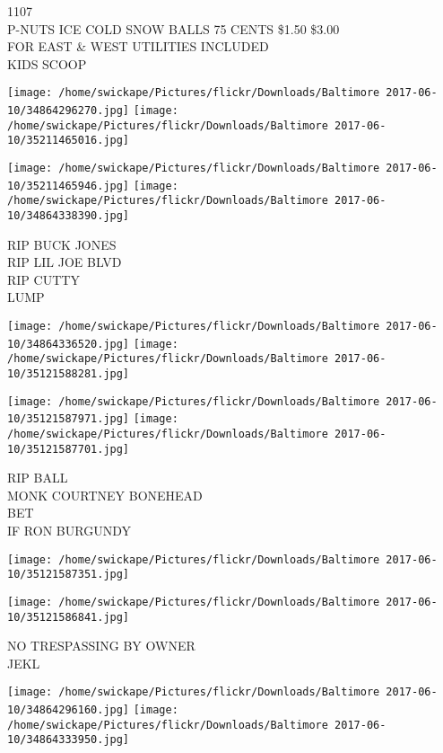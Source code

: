 \documentclass[10pt,letterpaper]{article}
\begin{document}
1107\\
P{-}NUTS ICE COLD SNOW BALLS 75 CENTS \$1.50 \$3.00\\
FOR EAST \& WEST UTILITIES INCLUDED\\
KIDS SCOOP\\
\pagebreak

\texttt{[image: /home/swickape/Pictures/flickr/Downloads/Baltimore 2017-06-10/34864296270.jpg]}
\texttt{[image: /home/swickape/Pictures/flickr/Downloads/Baltimore 2017-06-10/35211465016.jpg]}

\texttt{[image: /home/swickape/Pictures/flickr/Downloads/Baltimore 2017-06-10/35211465946.jpg]}
\texttt{[image: /home/swickape/Pictures/flickr/Downloads/Baltimore 2017-06-10/34864338390.jpg]}

RIP BUCK JONES\\
RIP LIL JOE BLVD\\
RIP CUTTY\\
LUMP\\
\pagebreak

\texttt{[image: /home/swickape/Pictures/flickr/Downloads/Baltimore 2017-06-10/34864336520.jpg]}
\texttt{[image: /home/swickape/Pictures/flickr/Downloads/Baltimore 2017-06-10/35121588281.jpg]}

\texttt{[image: /home/swickape/Pictures/flickr/Downloads/Baltimore 2017-06-10/35121587971.jpg]}
\texttt{[image: /home/swickape/Pictures/flickr/Downloads/Baltimore 2017-06-10/35121587701.jpg]}

RIP BALL\\
MONK COURTNEY BONEHEAD\\
BET\\
IF RON BURGUNDY\\
\pagebreak

\texttt{[image: /home/swickape/Pictures/flickr/Downloads/Baltimore 2017-06-10/35121587351.jpg]}

\vspace{0.25in}
\texttt{[image: /home/swickape/Pictures/flickr/Downloads/Baltimore 2017-06-10/35121586841.jpg]}

NO TRESPASSING BY OWNER\\
JEKL\\
\pagebreak

\texttt{[image: /home/swickape/Pictures/flickr/Downloads/Baltimore 2017-06-10/34864296160.jpg]}
\texttt{[image: /home/swickape/Pictures/flickr/Downloads/Baltimore 2017-06-10/34864333950.jpg]}
\end{document}
